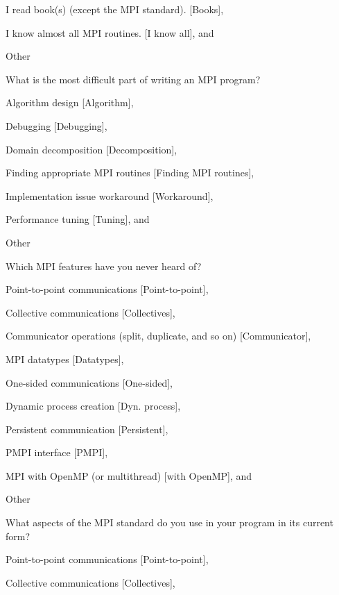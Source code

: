 \documentclass[preprint,5p,times]{elsarticle}
\begin{document}
{{\begin{description}[leftmargin=3mm]
\begin{inparaenum}[{\bf C}1)]
    \item I read book(s) (except the MPI standard). [Books],
    \item I know almost all MPI routines. [I know all], and
    \item Other
    \end{inparaenum}
  \item[Q15:] What is the most difficult part of writing an MPI program?
    \begin{inparaenum}[{\bf C}1)]
    \item Algorithm design [Algorithm],
    \item Debugging [Debugging],
    \item Domain decomposition [Decomposition],
    \item Finding appropriate MPI routines [Finding MPI routines],
    \item Implementation issue workaround [Workaround],
    \item Performance tuning [Tuning], and
    \item Other
    \end{inparaenum}
  \item[Q16*:] Which MPI features have you never heard of?
    \begin{inparaenum}[{\bf C}1)]
    \item Point-to-point communications [Point-to-point],
    \item Collective communications [Collectives],
    \item Communicator operations (split, duplicate, and so on) [Communicator],
    \item MPI datatypes [Datatypes],
    \item One-sided communications [One-sided],
    \item Dynamic process creation [Dyn. process],
    \item Persistent communication [Persistent],
    \item PMPI interface [PMPI],
    \item MPI with OpenMP (or multithread) [with OpenMP], and
    \item Other
    \end{inparaenum}
  \item[Q17*:] What aspects of the MPI standard do you use in your program in its current form?
    \begin{inparaenum}[{\bf C}1)]
    \item Point-to-point communications [Point-to-point],
    \item Collective communications [Collectives],

\end{inparaenum}
\end{description}}}
\end{document}
